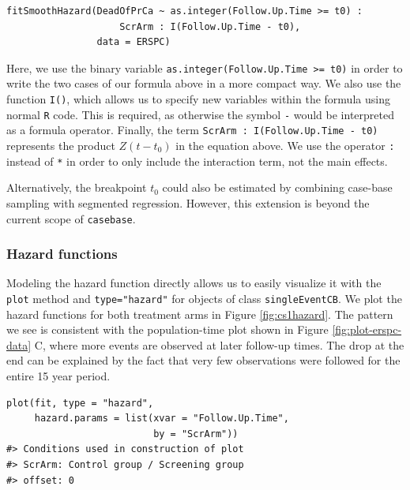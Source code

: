 \begin{verbatim}
fitSmoothHazard(DeadOfPrCa ~ as.integer(Follow.Up.Time >= t0) :
                    ScrArm : I(Follow.Up.Time - t0),
                data = ERSPC)
\end{verbatim}

Here, we use the binary variable \texttt{as.integer(Follow.Up.Time\ \textgreater{}=\ t0)} in order to write the two cases of our formula above in a more compact way. We also use the function \texttt{I()}, which allows us to specify new variables within the formula using normal \texttt{R} code. This is required, as otherwise the symbol \texttt{-} would be interpreted as a formula operator. Finally, the term \texttt{ScrArm\ :\ I(Follow.Up.Time\ -\ t0)} represents the product \(Z (t - t_0)\) in the equation above. We use the operator \texttt{:} instead of \texttt{*} in order to only include the interaction term, not the main effects.

Alternatively, the breakpoint \(t_0\) could also be estimated by combining case-base sampling with segmented regression. However, this extension is beyond the current scope of \texttt{casebase}.

\hypertarget{hazard-functions}{%
\subsubsection{Hazard functions}\label{hazard-functions}}

Modeling the hazard function directly allows us to easily visualize it with
the \texttt{plot} method and \texttt{type="hazard"} for objects of class \texttt{singleEventCB}.
We plot the hazard functions for both treatment arms in Figure \ref{fig:cs1hazard}.
The pattern we see is consistent with the population-time plot shown in Figure \ref{fig:plot-erspc-data} C, where more events are observed at later follow-up times.
The drop at the end can be explained by the fact that very few observations were followed for the entire 15 year period.

\begin{verbatim}
plot(fit, type = "hazard",
     hazard.params = list(xvar = "Follow.Up.Time",
                          by = "ScrArm"))
#> Conditions used in construction of plot
#> ScrArm: Control group / Screening group
#> offset: 0
\end{verbatim}

